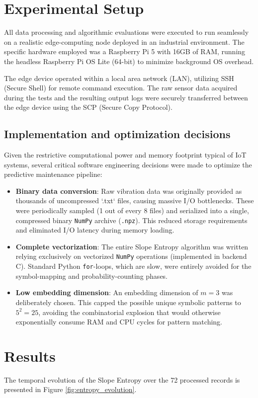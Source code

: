\documentclass{article}
\begin{document}
\section{Experimental Setup}
All data processing and algorithmic evaluations were executed to run seamlessly on a realistic edge-computing node deployed in an industrial environment. The specific hardware employed was a Raspberry Pi 5 with 16GB of RAM, running the headless Raspberry Pi OS Lite (64-bit) to minimize background OS overhead. 

The edge device operated within a local area network (LAN), utilizing SSH (Secure Shell) for remote command execution. The raw sensor data acquired during the tests and the resulting output logs were securely transferred between the edge device using the SCP (Secure Copy Protocol).

\subsection{Implementation and optimization decisions}
Given the restrictive computational power and memory footprint typical of IoT systems, several critical software engineering decisions were made to optimize the predictive maintenance pipeline:
\begin{itemize}
    \item \textbf{Binary data conversion}: Raw vibration data was originally provided as thousands of uncompressed `.txt` files, causing massive I/O bottlenecks. These were periodically sampled (1 out of every 8 files) and serialized into a single, compressed binary \texttt{NumPy} archive (\texttt{.npz}). This reduced storage requirements and eliminated I/O latency during memory loading.
    \item \textbf{Complete vectorization}: The entire Slope Entropy algorithm was written relying exclusively on vectorized \texttt{NumPy} operations (implemented in backend C). Standard Python \texttt{for}-loops, which are  slow, were entirely avoided for the symbol-mapping and probability-counting phases.
    \item \textbf{Low embedding dimension}: An embedding dimension of $m=3$ was deliberately chosen. This capped the possible unique symbolic patterns to $5^2 = 25$, avoiding the combinatorial explosion that would otherwise exponentially consume RAM and CPU cycles for pattern matching.
\end{itemize}


\section{Results}
The temporal evolution of the Slope Entropy over the 72 processed records is presented in Figure \ref{fig:entropy_evolution}. 
\end{document}
